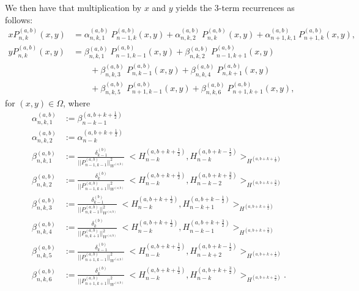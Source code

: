 \documentclass[11pt, oneside]{article}   	%
\newcommand{\half}{\frac{1}{2}}
\newcommand{\Pnk}{P_{n,k}}
\newcommand{\alphaab}{\alpha^{(a,b)}}
\newcommand{\betaab}{\beta^{(a,b)}}
\begin{document}
We then have that multiplication by \(x\) and \(y\) yields the 3-term recurrences as follows:
\begin{align}
x \Pnk^{(a,b)}(x,y) &= \alphaab_{n,k,1} \: P_{n-1, k}^{(a,b)}(x, y) + \alphaab_{n,k,2} \: P_{n, k}^{(a,b)}(x, y) + \alphaab_{n+1,k,1} \: P_{n+1, k}^{(a,b)}(x, y), \\
y \Pnk^{(a,b)}(x,y) &= \betaab_{n,k,1} \: P_{n-1, k-1}^{(a,b)}(x, y) + \betaab_{n,k,2} \: P_{n-1, k+1}^{(a,b)}(x, y) \nonumber \\
		& \quad \quad + \betaab_{n,k,3} \: P_{n, k-1}^{(a,b)}(x, y) + \betaab_{n,k,4} \: P_{n, k+1}^{(a,b)}(x, y) \nonumber \\
		& \quad \quad + \betaab_{n,k,5} \: P_{n+1, k-1}^{(a,b)}(x, y) + \betaab_{n,k,6} \: P_{n+1, k+1}^{(a,b)}(x, y),
\end{align}
for \((x,y) \in \Omega\), where
\begin{align}
\alphaab_{n,k,1} &:= \beta_{n-k-1}^{(a, b+k+\half)} \\
\alphaab_{n,k,2} &:= \alpha_{n-k}^{(a, b+k+\half)} \\
\betaab_{n,k,1} &:= \frac{\delta_{k-1}^{(b)}}{|| P_{n-1,k-1}^{(a,b)} ||_{W^{(a,b)}}^2} \: <H_{n-k}^{(a, b+k+\half)}, H_{n-k}^{(a, b+k-\half)}>_{H^{(a, b+k+\half)}} \\
\betaab_{n,k,2} &:= \frac{\delta_{k}^{(b)}}{|| P_{n-1,k+1}^{(a,b)} ||_{W^{(a,b)}}^2} \: <H_{n-k}^{(a, b+k+\half)}, H_{n-k-2}^{(a, b+k+\frac{3}{2})}>_{H^{(a, b+k+\frac{3}{2})}} \\
\betaab_{n,k,3} &:= \frac{\delta_{k-1}^{(b)}}{|| P_{n,k-1}^{(a,b)} ||_{W^{(a,b)}}^2} \: <H_{n-k}^{(a, b+k+\half)}, H_{n-k+1}^{(a, b+k-\half)}>_{H^{(a, b+k+\half)}} \\
\betaab_{n,k,4} &:= \frac{\delta_{k}^{(b)}}{|| P_{n,k+1}^{(a,b)} ||_{W^{(a,b)}}^2} \: <H_{n-k}^{(a, b+k+\half)}, H_{n-k-1}^{(a, b+k+\frac{3}{2})}>_{H^{(a, b+k+\frac{3}{2})}} \\
\betaab_{n,k,5} &:= \frac{\delta_{k-1}^{(b)}}{|| P_{n+1,k-1}^{(a,b)} ||_{W^{(a,b)}}^2} \: <H_{n-k}^{(a, b+k+\half)}, H_{n-k+2}^{(a, b+k-\half)}>_{H^{(a, b+k+\half)}} \\
\betaab_{n,k,6} &:= \frac{\delta_{k}^{(b)}}{|| P_{n+1,k+1}^{(a,b)} ||_{W^{(a,b)}}^2} \: <H_{n-k}^{(a, b+k+\half)}, H_{n-k}^{(a, b+k+\frac{3}{2})}>_{H^{(a, b+k+\frac{3}{2})}}. 
\end{align}
\end{document}
